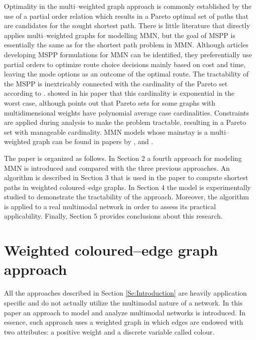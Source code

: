 \documentclass[preprint,authoryear,12pt]{elsarticle}
\begin{document}
Optimality in the multi--weighted graph approach is commonly
established by the use of a partial order relation which results
in a Pareto optimal set of paths that are candidates for the
sought shortest path. There is little literature that directly
applies multi--weighted graphs for modelling MMN, but the goal of
MSPP is essentially the same as for the shortest path problem in MMN.
Although articles developing MSPP formulations for MMN can be identified,
they preferentially use partial orders to optimize route choice
decisions mainly based on cost and time, leaving the mode options
as an outcome of the optimal route.
The tractability of the MSPP is inextricably connected with the
cardinality of the Pareto set according to \cite{Muller2006}.
\cite{Hansen_1980} showed in his paper that this cardinality is exponential
in the worst case, although \cite{Loui1983} points out that Pareto
sets for some graphs with multidimensional weights have polynomial
average case cardinalities.
Constraints are applied during analysis to make the problem tractable,
resulting in a Pareto set with manageable cardinality.
MMN models whose mainstay is a multi--weighted graph can be found
in papers by \cite{Andro2009}, \cite{D95} and \cite{D953}.

The paper is organized as follows.
In Section 2 a fourth approach for modeling MMN is introduced and
compared with the three previous approaches.
An algorithm is described in Section 3 that is used in the paper
to compute shortest paths in weighted coloured--edge graphs.
In Section 4 the model is experimentally studied
to demonstrate the tractability of the approach.
Moreover, the algorithm is applied to a real multimodal network
in order to assess its practical applicability.
Finally, Section 5 provides conclusions about this research.


\section{Weighted coloured--edge graph approach}

All the approaches described in Section \ref{Se:Introduction} are heavily
application specific and do not actually utilize the multimodal nature of
a network. In this paper an approach to model and analyze multimodal networks
is introduced. In essence, such approach uses a weighted graph in which edges are
endowed with two attributes: a positive weight and a discrete variable
called colour.
\end{document}
